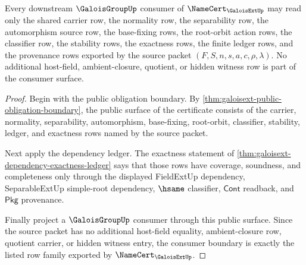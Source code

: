 \begin{theorem}
\label{thm:galoisext-galoisgroup-consumer-boundary}
Every downstream $\GaloisGroupUp$ consumer of
$\NameCert_{\GaloisExtUp}$ may read only the shared carrier row, the normality
row, the separability row, the automorphism source row, the base-fixing rows,
the root-orbit action rows, the classifier row, the stability rows, the
exactness rows, the finite ledger rows, and the provenance rows exported by
the source packet $(F,S,n,s,a,c,\rho,\lambda)$. No additional host-field,
ambient-closure, quotient, or hidden witness row is part of the consumer
surface.
\end{theorem}
\begin{proof}
Begin with the public obligation boundary. By
\autoref{thm:galoisext-public-obligation-boundary}, the public surface of the
certificate consists of the carrier, normality, separability, automorphism,
base-fixing, root-orbit, classifier, stability, ledger, and exactness rows
named by the source packet.

Next apply the dependency ledger. The exactness statement of
\autoref{thm:galoisext-dependency-exactness-ledger} says that those rows have
coverage, soundness, and completeness only through the displayed FieldExtUp
dependency, SeparableExtUp simple-root dependency, $\hsame$ classifier,
$\mathsf{Cont}$ readback, and $\mathsf{Pkg}$ provenance.

Finally project a $\GaloisGroupUp$ consumer through this public surface. Since
the source packet has no additional host-field equality, ambient-closure row,
quotient carrier, or hidden witness entry, the consumer boundary is exactly
the listed row family exported by $\NameCert_{\GaloisExtUp}$.
\end{proof}

